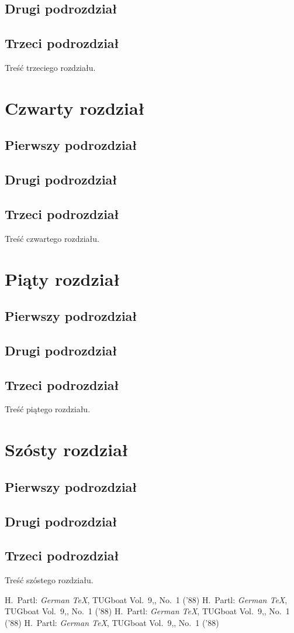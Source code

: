 \documentclass[12pt,a4paper,titlepage]{report}
\begin{document}
\section{Drugi podrozdział}
\section{Trzeci podrozdział}
Treść trzeciego rozdziału.
\newpage
\chapter{Czwarty rozdział}
\section{Pierwszy podrozdział}
\section{Drugi podrozdział}
\section{Trzeci podrozdział}
Treść czwartego rozdziału.
\newpage
\chapter{Piąty rozdział}
\section{Pierwszy podrozdział}
\section{Drugi podrozdział}
\section{Trzeci podrozdział}
Treść piątego rozdziału.
\newpage
\chapter{Szósty rozdział}
\section{Pierwszy podrozdział}
\section{Drugi podrozdział}
\section{Trzeci podrozdział}
Treść szóstego rozdziału.
\newpage
\begin{thebibliography}{99}
 H.~Partl:
\emph{German \TeX},
TUGboat Vol.~9,, No.~1 ('88)
 H.~Partl:
\emph{German \TeX},
TUGboat Vol.~9,, No.~1 ('88)
 H.~Partl:
\emph{German \TeX},
TUGboat Vol.~9,, No.~1 ('88)
 H.~Partl:
\emph{German \TeX},
TUGboat Vol.~9,, No.~1 ('88)
\end{thebibliography}
\end{document}
